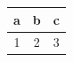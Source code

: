 \documentclass[reprint,amsmath,amssymb,aps]{revtex4-1}
\begin{document}
\begin{tabular}{ccc}
\toprule
a & b & c \\
\hline
1 & 2 & 3\\
\bottomrule
\end{tabular}
\end{document}
